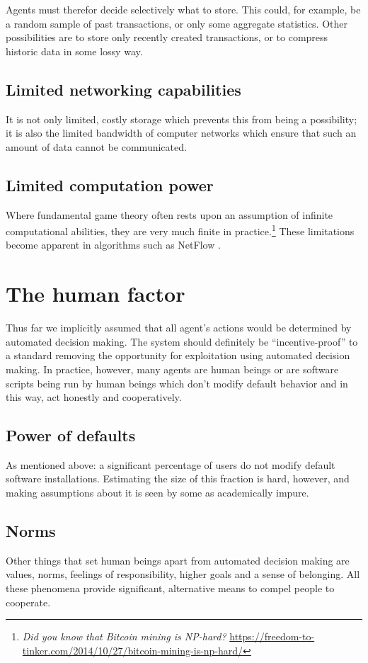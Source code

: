 Agents must therefor decide selectively what to store. This could, for example, be a random sample of past transactions, or only some aggregate statistics. Other possibilities are to store only recently created transactions, or to compress historic data in some lossy way.

\subsection{Limited networking capabilities}
It is not only limited, costly storage which prevents this from being a possibility; it is also the limited bandwidth of computer networks which ensure that such an amount of data cannot be communicated.

\subsection{Limited computation power}
Where fundamental game theory often rests upon an assumption of infinite computational abilities, they are very much finite in practice.\footnote{\emph{Did you know that Bitcoin mining is NP-hard?} \url{https://freedom-to-tinker.com/2014/10/27/bitcoin-mining-is-np-hard/}} These limitations become apparent in algorithms such as NetFlow \cite{otte2016sybil}.

\section{The human factor}
Thus far we implicitly assumed that all agent's actions would be determined by automated decision making. The system should definitely be ``incentive-proof'' to a standard removing the opportunity for exploitation using automated decision making. In practice, however, many agents are human beings or are software scripts being run by human beings which don't modify default behavior and in this way, act honestly and cooperatively.

\subsection{Power of defaults}
As mentioned above: a significant percentage of users do not modify default software installations. Estimating the size of this fraction is hard, however, and making assumptions about it is seen by some as academically impure.

\subsection{Norms}
Other things that set human beings apart from automated decision making are values, norms, feelings of responsibility, higher goals and a sense of belonging. All these phenomena provide significant, alternative means to compel people to cooperate.

